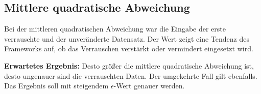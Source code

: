 \subsection{Mittlere quadratische Abweichung}
Bei der mittleren quadratischen Abweichung war die Eingabe der erste verrauschte und der unveränderte Datensatz. Der Wert zeigt eine Tendenz des Frameworks auf, ob das Verrauschen verstärkt oder vermindert eingesetzt wird.

\textbf{Erwartetes Ergebnis:}
Desto größer die mittlere quadratische Abweichung ist, desto ungenauer sind die verrauschten Daten. Der umgekehrte Fall gilt ebenfalls. Das Ergebnis soll mit steigendem $\epsilon$-Wert genauer werden.
\begin{figure}[htbp]
	\centering
	 \qquad
\end{figure}

